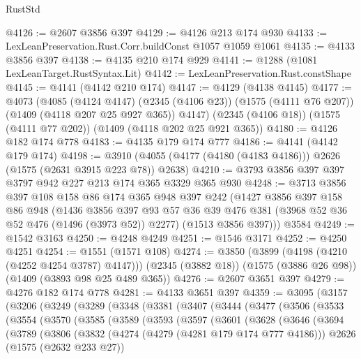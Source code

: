 \begin{lexlean}{RustStd}
\begin{coremodule}
@4126 := @2607 @3856 @397
@4129 := @4126 @213 @174 @930
@4133 := LexLeanPreservation.Rust.Corr.buildConst @1057 @1059 @1061
@4135 := @4133 @3856 @397
@4138 := @4135 @210 @174 @929
@4141 := @1288 (@1081 LexLeanTarget.RustSyntax.Lit)
@4142 := LexLeanPreservation.Rust.constShape
@4145 := @4141 (@4142 @210 @174)
@4147 := @4129 (@4138 @4145)
@4177 := @4073
    (@4085
      (@4124 @4147)
      (@2345 (@4106 @23))
      (@1575 (@4111 @76 @207))
      (@1409 (@4118 @207 @25 @927 @365))
      @4147)
    (@2345 (@4106 @18))
    (@1575 (@4111 @77 @202))
    (@1409 (@4118 @202 @25 @921 @365))
@4180 := @4126 @182 @174 @778
@4183 := @4135 @179 @174 @777
@4186 := @4141 (@4142 @179 @174)
@4198 := @3910 (@4055 (@4177 (@4180 (@4183 @4186))) @2626 (@1575 (@2631 @3915 @223 @78)) @2638)
@4210 := @3793 @3856 @397 @397 @3797 @942 @227 @213 @174 @365 @3329 @365 @930
@4248 := @3713
    @3856
    @397
    @108
    @158
    @86
    @174
    @365
    @948
    @397
    @242
    (@1427
      @3856
      @397
      @158
      @86
      @948
      (@1436
        @3856
        @397
        @93
        @57
        @36
        @39
        @476
        @381
        (@3968 @52 @36 @52 @476 (@1496 (@3973 @52)) @2277)
        (@1513 @3856 @397)))
    @3584
@4249 := @1542 @3163
@4250 := @4248 @4249
@4251 := @1546 @3171
@4252 := @4250 @4251
@4254 := @1551 (@1571 @108)
@4274 := @3850
    (@3899 (@4198 (@4210 (@4252 @4254 @3787) @4147)))
    (@2345 (@3882 @18))
    (@1575 (@3886 @26 @98))
    (@1409 (@3893 @98 @25 @489 @365))
@4276 := @2607 @3651 @397
@4279 := @4276 @182 @174 @778
@4281 := @4133 @3651 @397
@4359 := @3095
    (@3157
      (@3206
        (@3249
          (@3289
            (@3348
              (@3381
                (@3407
                  (@3444
                    (@3477
                      (@3506
                        (@3533
                          (@3554
                            (@3570
                              (@3585
                                (@3589
                                  (@3593
                                    (@3597
                                      (@3601
                                        (@3628
                                          (@3646
                                            (@3694
                                              (@3789
                                                (@3806
                                                  (@3832
                                                    (@4274 (@4279 (@4281 @179 @174 @777 @4186)))
                                                    @2626
                                                    (@1575 (@2632 @233 @27))

\end{coremodule}
\end{lexlean}
